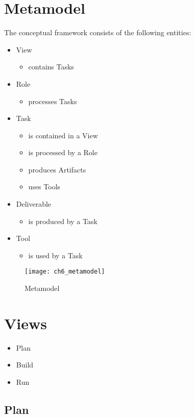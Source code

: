 \section{Metamodel} 
The conceptual framework consists of the following entities:
\begin{itemize}
	\item View
	\begin{itemize}
		\item contains Tasks
	\end{itemize}
	\item Role
	\begin{itemize}
		\item processes Tasks
	\end{itemize}
	\item Task
	\begin{itemize}
		\item is contained in a View
		\item is processed by a Role
		\item produces Artifacts
		\item uses Tools
	\end{itemize}
	\item Deliverable
	\begin{itemize}
		\item is produced by a Task
	\end{itemize}
	\item Tool
	\begin{itemize}
		\item is used by a Task
	\end{itemize}
\end{itemize}

\begin{figure}
	[htpb] \centering 
	\texttt{[image: ch6\_metamodel]} 
	\caption{Metamodel} 
	\label{fig:ch6_metamodel} 
\end{figure}

\section{Views}
\begin{itemize}
	\item Plan
	\item Build
	\item Run
\end{itemize}

\subsection{Plan}

